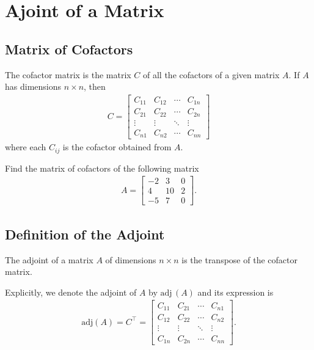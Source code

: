 \documentclass[12pt,a4paper]{article}
\newcounter{example}[section]
\begin{document}
\newpage

\section{Ajoint of a Matrix}

	\subsection{Matrix of Cofactors}
	
	The cofactor matrix is the matrix $C$ of all the cofactors of a given matrix $A$. If $A$ has dimensions $n \times n$, then
		\begin{align*}
		C = \begin{bmatrix}
		C_{11} & C_{12} & \cdots & C_{1n} \\
		C_{21} & C_{22} & \cdots & C_{2n} \\
		\vdots & \vdots & \ddots & \vdots \\
		C_{n1} & C_{n2} & \cdots & C_{nn} 
		\end{bmatrix} 
		\end{align*}
	where each $C_{ij}$ is the cofactor obtained from $A$.
	
	\vspace*{16pt}
	
	\begin{example}\label{Example:CofactorMatrix}
	Find the matrix of cofactors of the following matrix
		\begin{align*}
		A = \begin{bmatrix}
		-2 & 3 & 0 \\
		4 & 10 & 2 \\
		-5 & 7 & 0
		\end{bmatrix} .
		\end{align*}
	\end{example}
	
	\newpage
	
	\subsection{Definition of the Adjoint}
	The adjoint of a matrix $A$ of dimensions $n \times n$ is the transpose of the cofactor matrix. 
	
	\vspace*{16pt}
	
	\noindent Explicitly, we denote the adjoint of $A$ by $\mathrm{adj}\, (A)$ and its expression is
	\begin{align*}
	\mathrm{adj} (A) = C^{\top} = \begin{bmatrix}
		C_{11} & C_{21} & \cdots & C_{n1} \\
		C_{12} & C_{22} & \cdots & C_{n2} \\
		\vdots & \vdots & \ddots & \vdots \\
		C_{1n} & C_{2n} & \cdots & C_{nn} 
		\end{bmatrix}  .
	\end{align*}
	
\end{document}
